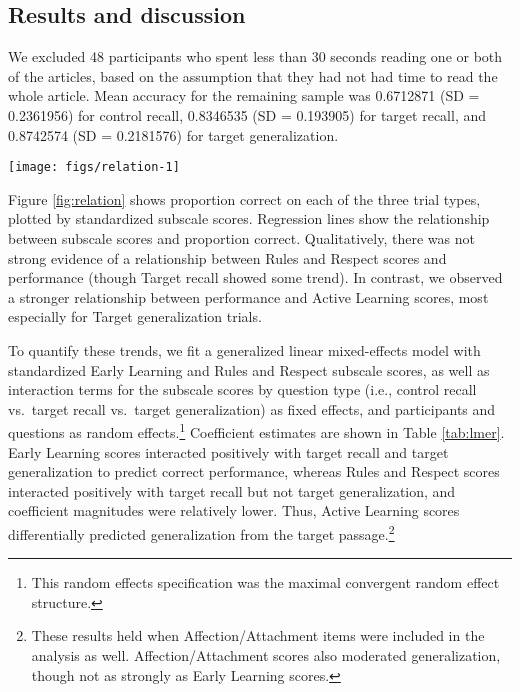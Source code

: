 \documentclass[10pt, letterpaper]{article}
\newenvironment{CodeChunk}{}{}
\begin{document}
\subsection{Results and discussion}\label{results-and-discussion}

We excluded 48 participants who spent less than 30 seconds reading one
or both of the articles, based on the assumption that they had not had
time to read the whole article. Mean accuracy for the remaining sample
was 0.6712871 (SD = 0.2361956) for control recall, 0.8346535 (SD =
0.193905) for target recall, and 0.8742574 (SD = 0.2181576) for target
generalization.

\begin{CodeChunk}
\begin{figure*}[!h]

{\centering \texttt{[image: figs/relation-1]} 

}

\caption[Relationship between subscale scores and uptake of articles]{Relationship between subscale scores and uptake of articles.}\label{fig:relation}
\end{figure*}
\end{CodeChunk}

Figure \ref{fig:relation} shows proportion correct on each of the three
trial types, plotted by standardized subscale scores. Regression lines
show the relationship between subscale scores and proportion correct.
Qualitatively, there was not strong evidence of a relationship between
Rules and Respect scores and performance (though Target recall showed
some trend). In contrast, we observed a stronger relationship between
performance and Active Learning scores, most especially for Target
generalization trials.

To quantify these trends, we fit a generalized linear mixed-effects
model with standardized Early Learning and Rules and Respect subscale
scores, as well as interaction terms for the subscale scores by question
type (i.e., control recall vs.~target recall vs.~target generalization)
as fixed effects, and participants and questions as random
effects.\footnote{This random effects specification was the maximal
  convergent random effect structure.} Coefficient estimates are shown
in Table \ref{tab:lmer}. Early Learning scores interacted positively
with target recall and target generalization to predict correct
performance, whereas Rules and Respect scores interacted positively with
target recall but not target generalization, and coefficient magnitudes
were relatively lower. Thus, Active Learning scores differentially
predicted generalization from the target passage.\footnote{These results
  held when Affection/Attachment items were included in the analysis as
  well. Affection/Attachment scores also moderated generalization,
  though not as strongly as Early Learning scores.}
\end{document}
